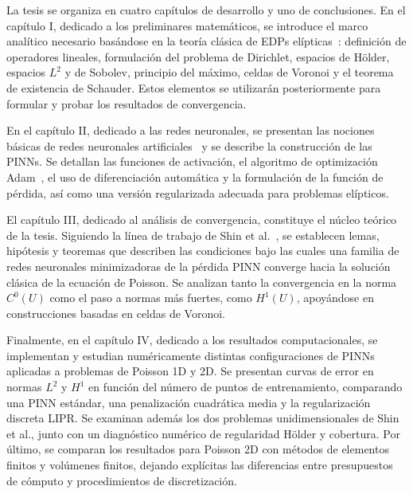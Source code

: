 La tesis se organiza en cuatro capítulos de desarrollo y uno de conclusiones. En el capítulo I, dedicado a los preliminares matemáticos, se introduce el marco analítico necesario basándose en la teoría clásica de EDPs elípticas~\cite{gilbarg2001elliptic}: definición de operadores lineales, formulación del problema de Dirichlet, espacios de Hölder, espacios $L^2$ y de Sobolev, principio del máximo, celdas de Voronoi y el teorema de existencia de Schauder. Estos elementos se utilizarán posteriormente para formular y probar los resultados de convergencia.

En el capítulo II, dedicado a las redes neuronales, se presentan las nociones básicas de redes neuronales artificiales~\cite{bishop2006pattern} y se describe la construcción de las PINNs. Se detallan las funciones de activación, el algoritmo de optimización Adam~\cite{adam2015method}, el uso de diferenciación automática y la formulación de la función de pérdida, así como una versión regularizada adecuada para problemas elípticos.

El capítulo III, dedicado al análisis de convergencia, constituye el núcleo teórico de la tesis. Siguiendo la línea de trabajo de Shin et al.~\cite{shin2020convergence}, se establecen lemas, hipótesis y teoremas que describen las condiciones bajo las cuales una familia de redes neuronales minimizadoras de la pérdida PINN converge hacia la solución clásica de la ecuación de Poisson. Se analizan tanto la convergencia en la norma $C^0(U)$ como el paso a normas más fuertes, como $H^1(U)$, apoyándose en construcciones basadas en celdas de Voronoi.

Finalmente, en el capítulo IV, dedicado a los resultados computacionales, se implementan y estudian numéricamente distintas configuraciones de PINNs aplicadas a problemas de Poisson 1D y 2D. Se presentan curvas de error en normas $L^2$ y $H^1$ en función del número de puntos de entrenamiento, comparando una PINN estándar, una penalización cuadrática media y la regularización discreta LIPR. Se examinan además los dos problemas unidimensionales de Shin et al., junto con un diagnóstico numérico de regularidad H\"older y cobertura. Por último, se comparan los resultados para Poisson 2D con métodos de elementos finitos y volúmenes finitos, dejando explícitas las diferencias entre presupuestos de cómputo y procedimientos de discretización.


